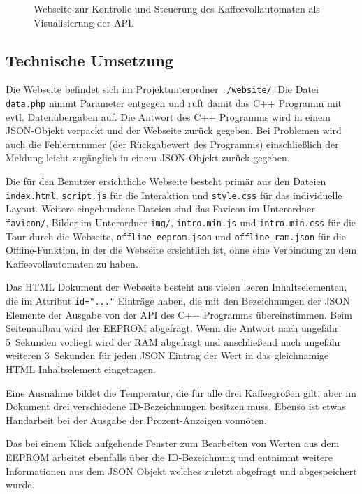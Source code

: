 \begin{figure}
\begin{center}
    \caption{Webseite zur Kontrolle und Steuerung des Kaffeevollautomaten als Visualisierung der API.}
    \label{fig:website}
  \end{center}
\end{figure}

\subsection{Technische Umsetzung}
Die Webseite befindet sich im Projektunterordner \texttt{./website/}.
Die Datei \texttt{data.php} nimmt Parameter entgegen und ruft damit das C++ Programm mit evtl. Datenübergaben auf.
Die Antwort des C++ Programms wird in einem \ac{JSON}-Objekt verpackt und der Webseite zurück gegeben.
Bei Problemen wird auch die Fehlernummer (der Rückgabewert des Programms) einschließlich der Meldung leicht zugänglich in einem \ac{JSON}-Objekt zurück gegeben.

Die für den Benutzer ersichtliche Webseite besteht primär aus den Dateien \texttt{index.html}, \texttt{script.js} für die Interaktion und \texttt{style.css} für das individuelle Layout.
Weitere eingebundene Dateien sind das Favicon im Unterordner \texttt{favicon/}, Bilder im Unterordner \texttt{img/}, \texttt{intro.min.js} und \texttt{intro.min.css} für die Tour durch die Webseite, \texttt{offline\_eeprom.json} und \texttt{offline\_ram.json} für die Offline-Funktion, in der die Webseite ersichtlich ist, ohne eine Verbindung zu dem Kaffeevollautomaten zu haben.

Das \ac{HTML} Dokument der Webseite besteht aus vielen leeren Inhaltselementen, die im Attribut \texttt{id="..."} Einträge haben, die mit den Bezeichnungen der \ac{JSON} Elemente der Ausgabe von der API des C++ Programms übereinstimmen.
Beim Seitenaufbau wird der \ac{EEPROM} abgefragt.
Wenn die Antwort nach ungefähr 5~Sekunden vorliegt wird der \ac{RAM} abgefragt und anschließend nach ungefähr weiteren 3~Sekunden für jeden \ac{JSON} Eintrag der Wert in das gleichnamige \ac{HTML} Inhaltselement eingetragen.

Eine Ausnahme bildet die Temperatur, die für alle drei Kaffeegrößen gilt, aber im Dokument drei verschiedene ID-Bezeichnungen besitzen muss.
Ebenso ist etwas Handarbeit bei der Ausgabe der Prozent-Anzeigen vonnöten.

Das bei einem Klick aufgehende Fenster zum Bearbeiten von Werten aus dem \ac{EEPROM} arbeitet ebenfalls über die ID-Bezeichnung und entnimmt weitere Informationen aus dem \ac{JSON} Objekt welches zuletzt abgefragt und abgespeichert wurde.

